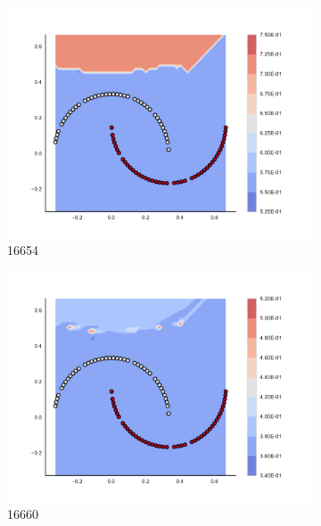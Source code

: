 \begin{figure}[h]
\begin{subfigure}[b]{0.09\textwidth}
    \includegraphics[clip, trim=2.35cm 1.75cm 4.5cm 0cm,width=\textwidth]{img/convergence/16654.pdf}
    \caption{16654}
    \label{fig:convergence_16654}
\end{subfigure}
%
\begin{subfigure}[b]{0.09\textwidth}
    \includegraphics[clip, trim=2.35cm 1.75cm 4.5cm 0cm,width=\textwidth]{img/convergence/16660.pdf}
    \caption{16660}
    \label{fig:convergence_16660}
\end{subfigure}
%
\begin{subfigure}[b]{0.09\textwidth}

\end{subfigure}
\end{figure}
